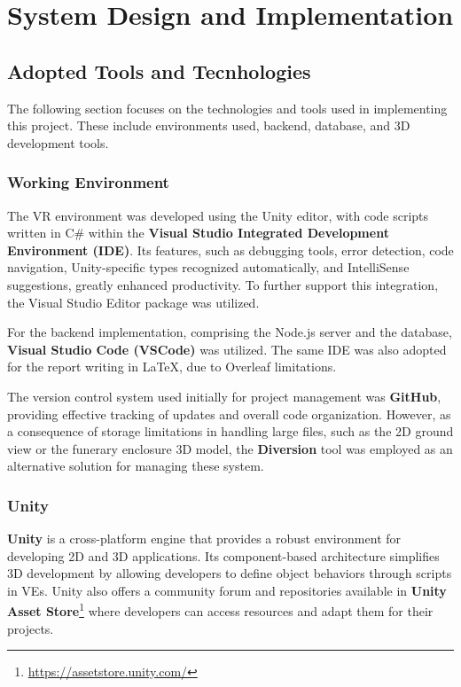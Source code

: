 
%

\chapter{System Design and Implementation}
\label{cha:system_implementation}

\section{Adopted Tools and Tecnhologies}

The following section focuses on the technologies and tools used in implementing this project. 
These include environments used, backend, database, and \gls{3D} development tools.

\subsection{Working Environment}

The  \gls{VR} environment was developed using the Unity editor, with code scripts written in C\# within the \textbf{Visual Studio Integrated Development Environment (IDE)}.
Its features, such as debugging tools, error detection, code navigation, Unity-specific types recognized automatically, and IntelliSense suggestions, greatly enhanced productivity. 
To further support this integration, the Visual Studio Editor package was utilized. 

For the backend implementation, comprising the Node.js server and the database, \textbf{Visual Studio Code (VSCode)} was utilized. 
The same IDE was also adopted for the report writing in LaTeX, due to Overleaf limitations.

The version control system used initially for project management was \textbf{GitHub}, providing effective tracking of updates and overall code organization.
However, as a consequence of storage limitations in handling large files, such as the \gls{2D} ground view or the funerary enclosure \gls{3D} model, the \textbf{Diversion} tool was employed as an alternative solution for managing these system.

\subsection{Unity}
\textbf{Unity} is a cross-platform engine that provides a robust environment for developing \gls{2D} and \gls{3D} applications. 
Its component-based architecture simplifies \gls{3D} development by allowing developers to define object behaviors through scripts in \glspl{VE}.
Unity also offers a community forum and repositories available in \textbf{Unity Asset Store}\footnote{\url{https://assetstore.unity.com/}} where developers can access resources and adapt them for their projects.

